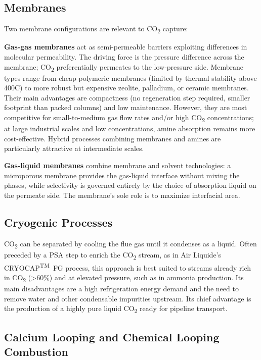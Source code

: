 \subsection{Membranes}

Two membrane configurations are relevant to CO\textsubscript{2} capture:

\textbf{Gas-gas membranes} act as semi-permeable barriers exploiting differences in 
molecular permeability. The driving force is the pressure difference across the 
membrane; CO\textsubscript{2} preferentially permeates to the low-pressure side. 
Membrane types range from cheap polymeric membranes (limited by thermal stability 
above 400\textdegree C) to more robust but expensive zeolite, palladium, or ceramic 
membranes. Their main advantages are compactness (no regeneration step required, 
smaller footprint than packed columns) and low maintenance. However, they are most 
competitive for small-to-medium gas flow rates and/or high CO\textsubscript{2} 
concentrations; at large industrial scales and low concentrations, amine absorption 
remains more cost-effective. Hybrid processes combining membranes and amines are 
particularly attractive at intermediate scales.

\textbf{Gas-liquid membranes} combine membrane and solvent technologies: a microporous 
membrane provides the gas-liquid interface without mixing the phases, while selectivity 
is governed entirely by the choice of absorption liquid on the permeate side. The 
membrane's sole role is to maximize interfacial area.

\subsection{Cryogenic Processes}

CO\textsubscript{2} can be separated by cooling the flue gas until it condenses as a 
liquid. Often preceded by a PSA step to enrich the CO\textsubscript{2} stream, as in 
Air Liquide's CRYOCAP\textsuperscript{TM}~FG process, this approach is best suited 
to streams already rich in CO\textsubscript{2} (>60\%) and at elevated pressure, such 
as in ammonia production. Its main disadvantages are a high refrigeration energy 
demand and the need to remove water and other condensable impurities upstream. Its 
chief advantage is the production of a highly pure liquid CO\textsubscript{2} ready 
for pipeline transport.

\subsection{Calcium Looping and Chemical Looping Combustion}

